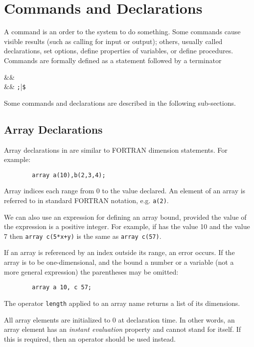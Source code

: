 \chapter{Commands and Declarations}

A command is an order to the system to do something.  Some
commands cause visible results (such as calling for input or output);
others, usually called declarations, set options,
define properties of variables, or define procedures.  Commands are
formally defined as a statement followed by a terminator
\begin{syntaxtable}
   &\BNFprod&  \\
   &\BNFprod& \texttt{;}|\texttt{\$}
\end{syntaxtable}
Some {\REDUCE} commands and declarations are described in the following
sub-sections.

\hypertarget{reserved:ARRAY}{\section{Array Declarations}}

Array declarations in {\REDUCE} are similar to FORTRAN
dimension statements.  For example:
\begin{verbatim}
        array a(10),b(2,3,4);
\end{verbatim}
Array indices each range from 0 to the value declared. An element of an
array is referred to in standard FORTRAN notation, e.g. \texttt{a(2)}.

We can also use an expression for defining an array bound, provided the
value of the expression is a positive integer. For example, if  has the
value 10 and  the value 7 then
\texttt{array c(5*x+y)} is the same as \texttt{array c(57)}.

If an array is referenced by an index outside its range, an error occurs.
If the array is to be one-dimensional, and the bound a number or a variable
(not a more general expression) the parentheses may be omitted:
\begin{verbatim}
        array a 10, c 57;
\end{verbatim}
The operator \texttt{length} applied to an array name
returns a list of its dimensions.

All array elements are initialized to 0 at declaration time. In other words,
an array element has an \emph{instant evaluation}
property and cannot stand for itself.  If this is required, then an
operator should be used instead.

